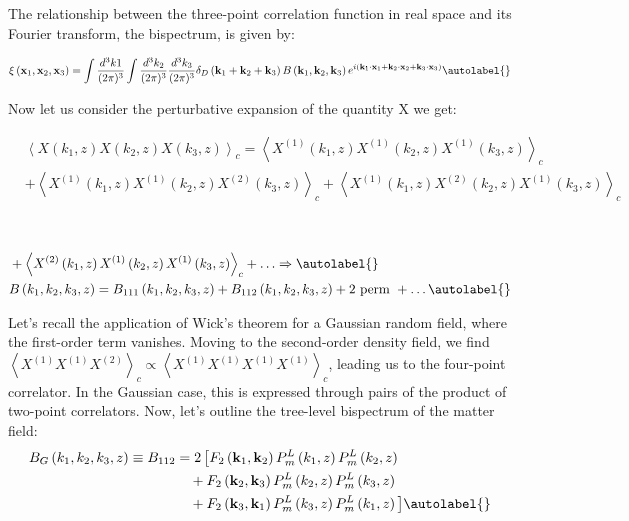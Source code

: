 The relationship between the three-point correlation function in real space and its Fourier transform, the bispectrum, is given by:

\begin{equation}
    \xi\left(\mathbf{x}_{1}, \mathbf{x}_{2}, \mathbf{x}_{3}\right) = \int \frac{d^{3}k{1}}{(2\pi)^{3}} \int \frac{d^{3}k_{2}}{(2\pi)^{3}} \frac{d^{3}k_{3}}{(2\pi)^{3}} \delta_{D}\left(\mathbf{k}_{1} + \mathbf{k}_{2} + \mathbf{k}_{3}\right) B\left(\mathbf{k}_{1}, \mathbf{k}_{2}, \mathbf{k}_{3}\right) e^{i\left(\mathbf{k}_{1} \cdot \mathbf{x}_{1} + \mathbf{k}_{2} \cdot \mathbf{x}_{2} + \mathbf{k}_{3} \cdot \mathbf{x}_{3}\right)} \autolabel{}
\end{equation}



Now let us consider the perturbative expansion of the quantity $\mathrm{X}$ we get:

$$
\begin{aligned}
    & \left\langle X\left(k_{1}, z\right) X\left(k_{2}, z\right) X\left(k_{3}, z\right)\right\rangle_{c}=\left\langle X^{(1)}\left(k_{1}, z\right) X^{(1)}\left(k_{2}, z\right) X^{(1)}\left(k_{3}, z\right)\right\rangle_{c} \\
    & +\left\langle X^{(1)}\left(k_{1}, z\right) X^{(1)}\left(k_{2}, z\right) X^{(2)}\left(k_{3}, z\right)\right\rangle_{c}+\left\langle X^{(1)}\left(k_{1}, z\right) X^{(2)}\left(k_{2}, z\right) X^{(1)}\left(k_{3}, z\right)\right\rangle_{c}
\end{aligned}
$$

\


\begin{align}
    & +\left\langle X^{(2)}\left(k_{1}, z\right) X^{(1)}\left(k_{2}, z\right) X^{(1)}\left(k_{3}, z\right)\right\rangle_{c}+\ldots \Rightarrow  \autolabel{}\\
    & B\left(k_{1}, k_{2}, k_{3}, z\right)=B_{111}\left(k_{1}, k_{2}, k_{3}, z\right)+B_{112}\left(k_{1}, k_{2}, k_{3}, z\right)+2 \text { perm }+\ldots \autolabel{}
\end{align}


Let's recall the application of Wick's theorem for a Gaussian random field, where the first-order term vanishes. Moving to the second-order density field, we find $\left\langle X^{(1)} X^{(1)} X^{(2)} \right\rangle_{c} \propto \left\langle X^{(1)} X^{(1)} X^{(1)} X^{(1)} \right\rangle_{c}$, leading us to the four-point correlator. In the Gaussian case, this is expressed through pairs of the product of two-point correlators. Now, let's outline the tree-level bispectrum of the matter field:
\begin{align*}
    B_{G}\left(k_{1}, k_{2}, k_{3}, z\right) \equiv B_{112} & = 2 \left[ F_{2}\left(\mathbf{k}_{1}, \mathbf{k}_{2}\right) P_{m}^{L}\left(k_{1}, z\right) P_{m}^{L}\left(k_{2}, z\right) \right. \\
    & \quad + F_{2}\left(\mathbf{k}_{2}, \mathbf{k}_{3}\right) P_{m}^{L}\left(k_{2}, z\right) P_{m}^{L}\left(k_{3}, z\right) \\
    & \quad + F_{2}\left(\mathbf{k}_{3}, \mathbf{k}_{1}\right) P_{m}^{L}\left(k_{3}, z\right) P_{m}^{L}\left(k_{1}, z\right) \big] \autolabel{}
\end{align*}

